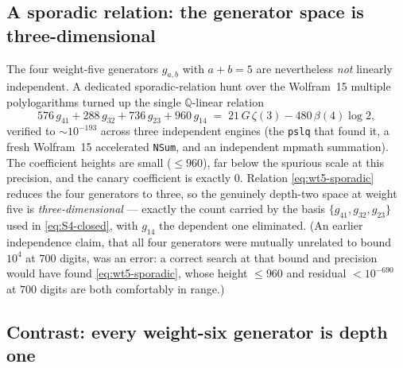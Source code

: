 \documentclass[11pt]{article}
\theoremstyle{plain}
\theoremstyle{remark}
\begin{document}
\subsection*{A sporadic relation: the generator space is three-dimensional}

The four weight-five generators $g_{a,b}$ with $a+b=5$ are nevertheless \emph{not} linearly independent. A dedicated sporadic-relation hunt over the Wolfram~15 multiple polylogarithms turned up the single $\mathbb{Q}$-linear relation
\begin{equation}
  \label{eq:wt5-sporadic}
  576\,g_{41}+288\,g_{32}+736\,g_{23}+960\,g_{14}
  \;=\; 21\,G\,\zeta(3)-480\,\beta(4)\log 2,
\end{equation}
verified to $\sim 10^{-193}$ across three independent engines (the \texttt{pslq} that found it, a fresh Wolfram~15 accelerated \texttt{NSum}, and an independent mpmath summation). The coefficient heights are small ($\le 960$), far below the spurious scale at this precision, and the canary coefficient is exactly $0$. Relation \eqref{eq:wt5-sporadic} reduces the four generators to three, so the genuinely depth-two space at weight five is \emph{three-dimensional} --- exactly the count carried by the basis $\{g_{41},g_{32},g_{23}\}$ used in \eqref{eq:S4-closed}, with $g_{14}$ the dependent one eliminated. (An earlier independence claim, that all four generators were mutually unrelated to bound $10^4$ at $700$ digits, was an error: a correct search at that bound and precision would have found \eqref{eq:wt5-sporadic}, whose height $\le 960$ and residual $<10^{-690}$ at $700$ digits are both comfortably in range.)

\subsection*{Contrast: every weight-six generator is depth one}
\end{document}
